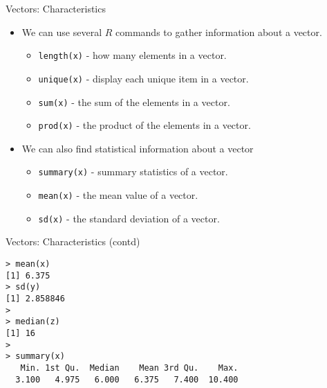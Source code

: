 \begin{frame}[fragile]{Vectors: Characteristics}

\begin{itemize}
\item We can use several $R$ commands to gather information about
a vector.

\begin{itemize}
\item \texttt{length(x)} - how many elements in a vector.  
\item \texttt{unique(x)} - display each unique item in a vector.  
\item \texttt{sum(x)} - the sum of the elements in a vector. 
\item \texttt{prod(x)} - the product of the elements in a vector.
\end{itemize}

\item We can also find statistical information about a vector
\begin{itemize}
\item \texttt{summary(x)} - summary statistics of a vector.  \item \texttt{mean(x)} -
the mean value of a vector. \item \texttt{sd(x)} -  the standard deviation
of a vector.
\end{itemize}

\end{itemize}
\end{frame}
\begin{frame}[fragile]{Vectors: Characteristics (contd)}



\begin{framed}
\begin{verbatim}
> mean(x)
[1] 6.375
> sd(y)
[1] 2.858846
>
> median(z)
[1] 16
>
> summary(x)
   Min. 1st Qu.  Median    Mean 3rd Qu.    Max.
  3.100   4.975   6.000   6.375   7.400  10.400
\end{verbatim}
\end{framed}
\end{frame}

